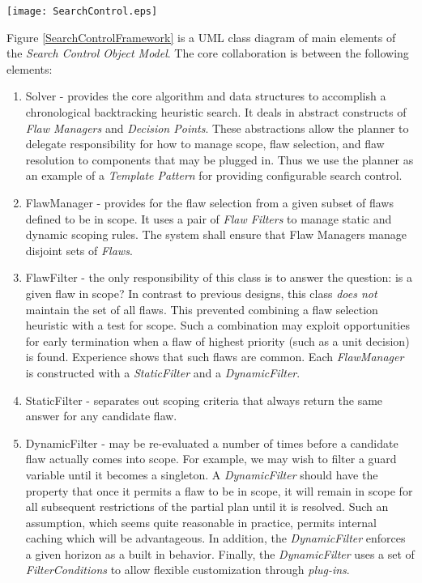 \documentclass[10pt, letterpaper, oneside]{article}
\begin{document}
\begin{figure*}[t]
\texttt{[image: SearchControl.eps]}
\caption{Search Control Object Model}
\label{SearchControlFramework}
\end{figure*}

Figure \ref{SearchControlFramework} is a UML class diagram of main elements of the {\em Search Control Object Model}. The core collaboration is between the following elements:
\begin{enumerate}
\item Solver - provides the core algorithm and data structures to accomplish a chronological backtracking heuristic search. It deals in abstract constructs of {\em Flaw Managers} and {\em Decision Points}. These abstractions allow the planner to delegate responsibility for how to manage scope, flaw selection, and flaw resolution to components that may be plugged in. Thus we use the planner as an example of a {\em Template Pattern} for providing configurable search control.
\item FlawManager - provides for the flaw selection from a given subset of flaws defined to be in scope. It uses a pair of {\em Flaw Filters} to manage static and dynamic scoping rules. The system shall ensure that Flaw Managers manage disjoint sets of {\em Flaws}.
\item FlawFilter - the only responsibility of this class is to answer the question: is a given flaw in scope? In contrast to previous designs, this class {\em does not} maintain the set of all flaws. This prevented combining a flaw selection heuristic with a test for scope. Such a combination may exploit opportunities for early termination when a flaw of highest priority (such as a unit decision) is found. Experience shows that such flaws are common. Each {\em FlawManager} is constructed with a {\em StaticFilter} and a {\em DynamicFilter}. 
\item StaticFilter - separates out scoping criteria that always return the same answer for any candidate flaw. 
\item DynamicFilter - may be re-evaluated a number of times before a candidate flaw actually comes into scope. For example, we may wish to filter a guard variable until it becomes a singleton. A {\em DynamicFilter} should have the property that once it permits a flaw to be in scope, it will remain in scope for all subsequent restrictions of the partial plan until it is resolved. Such an assumption, which seems quite reasonable in practice, permits internal caching which will be advantageous. In addition, the {\em DynamicFilter} enforces a given horizon as a built in behavior. Finally, the {\em DynamicFilter} uses a set of {\em FilterConditions} to allow flexible customization through {\em plug-ins}.

\end{enumerate}
\end{document}
